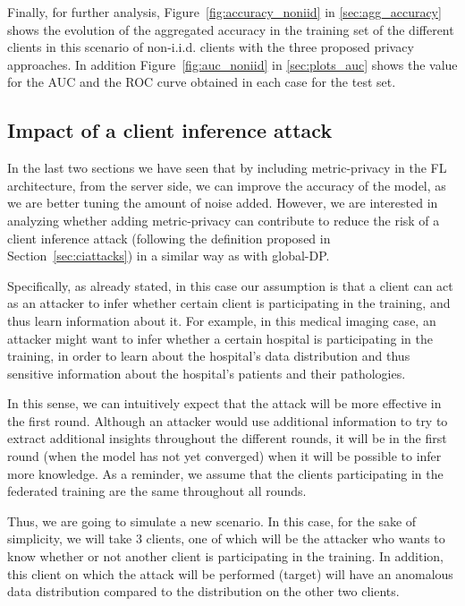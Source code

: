 \documentclass[5p,times]{elsarticle}
\begin{document}
Finally, for further analysis, Figure~\ref{fig:accuracy_noniid} in \ref{sec:agg_accuracy} shows the evolution of the aggregated accuracy in the training set of the different clients in this scenario of non-i.i.d. clients with the three proposed privacy approaches. In addition Figure~\ref{fig:auc_noniid} in \ref{sec:plots_auc} shows the value for the AUC and the ROC curve obtained in each case for the test set.

\subsection{Impact of a client inference attack}\label{sec:results_ciattacks}

In the last two sections we have seen that by including metric-privacy in the FL architecture, from the server side, we can improve the accuracy of the model, as we are better tuning the amount of noise added. However, we are interested in analyzing whether adding metric-privacy can contribute to reduce the risk of a client inference attack (following the definition proposed in Section~\ref{sec:ciattacks}) in a similar way as with global-DP. 

Specifically, as already stated, in this case our assumption is that a client can act as an attacker to infer whether certain client is participating in the training, and thus learn information about it. For example, in this medical imaging case, an attacker might want to infer whether a certain hospital is participating in the training, in order to learn about the hospital's data distribution and thus sensitive information about the hospital's patients and their pathologies. 

In this sense, we can intuitively expect that the attack will be more effective in the first round. Although an attacker would use additional information to try to extract additional insights throughout the different rounds, it will be in the first round (when the model has not yet converged) when it will be possible to infer more knowledge. As a reminder, we assume that the clients participating in the federated training are the same throughout all rounds.

Thus, we are going to simulate a new scenario. In this case, for the sake of simplicity, we will take 3 clients, one of which will be the attacker who wants to know whether or not another client is participating in the training. In addition, this client on which the attack will be performed  (target) will have an anomalous data distribution compared to the distribution on the other two clients.
\end{document}
